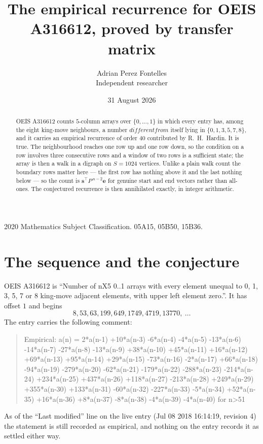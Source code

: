 \documentclass[11pt,a4paper]{article}
\title{The empirical recurrence for OEIS A316612, proved by transfer matrix}
\author{Adrian Perez Fontelles\\ \small Independent researcher}
\date{31 August 2026}
\theoremstyle{plain}
\theoremstyle{definition}
\begin{document}
\maketitle

\begin{abstract}
OEIS A316612 counts $5$-column arrays over $\{0,\dots,1\}$ in which every entry has,
among the eight king-move neighbours, a number $different from$ itself lying in $\{0,1,3,5,7,8\}$, and it carries an empirical
recurrence of order $40$ contributed by R.~H.~Hardin. It is true. The neighbourhood
reaches one row up and one row down, so the condition on a row involves three consecutive
rows and a window of two rows is a sufficient state; the array is then a walk in a digraph
on $S=1024$ vertices. Unlike a plain walk count the boundary rows matter here --- the first
row has nothing above it and the last nothing below --- so the count is
$\mathbf{s}^{\!\top}P^{\,n-2}\mathbf{e}$ for genuine start and end vectors rather than
all-ones. The conjectured recurrence is then annihilated exactly, in integer arithmetic.
\end{abstract}

\noindent\small 2020 Mathematics Subject Classification. 05A15, 05B50, 15B36.\normalsize

\section{The sequence and the conjecture}

OEIS A316612 is ``Number of nX5 0..1 arrays with every element unequal to 0, 1, 3, 5, 7 or 8 king-move adjacent elements, with upper left element zero.''. It has offset
$1$ and begins
\[
8, 53, 63, 199, 649, 1749, 4719, 13770,\ \dots
\]
The entry carries the following comment:
\begin{quote}\small
Empirical: a(n) = 2*a(n-1) +10*a(n-3) -6*a(n-4) -4*a(n-5) -13*a(n-6) -14*a(n-7) -27*a(n-8) -13*a(n-9) +38*a(n-10) +45*a(n-11) +16*a(n-12) +69*a(n-13) +95*a(n-14) +29*a(n-15) -73*a(n-16) -2*a(n-17) +66*a(n-18) -94*a(n-19) -279*a(n-20) -62*a(n-21) -179*a(n-22) -288*a(n-23) -214*a(n-24) +234*a(n-25) +437*a(n-26) +118*a(n-27) -213*a(n-28) +249*a(n-29) +355*a(n-30) +133*a(n-31) -60*a(n-32) -227*a(n-33) -5*a(n-34) +52*a(n-35) +16*a(n-36) +8*a(n-37) -8*a(n-38) -4*a(n-39) -4*a(n-40) for n>51
\end{quote}
As of the ``Last modified'' line on the live entry (Jul 08 2018 16:14:19, revision
4) the statement is still recorded as empirical, and nothing on the entry
records it as settled either way.
\end{document}
